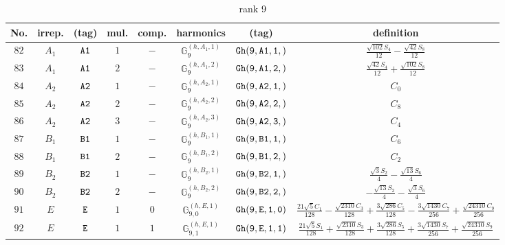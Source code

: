 \documentclass[fleqn,8pt]{jsarticle}
\begin{document}
\begin{table}[ht!]
\begin{center}
\caption{rank 9}
\renewcommand{\arraystretch}{1.3}
\begin{tabular}{cccccccc} \hline \hline
No. & irrep. & (tag) & mul. & comp. & harmonics & (tag) & definition \\ \hline
$ 82 $ & $ A_{1} $ & $ {\tt A1} $ & $ 1 $ & $ - $ & $ \mathbb{G}_{9}^{(h,A_{1},1)} $ & $ {\tt Gh(9,A1,1,)} $ & $ \frac{\sqrt{102} S_{4}}{12} - \frac{\sqrt{42} S_{8}}{12} $ \\
$ 83 $ & $ A_{1} $ & $ {\tt A1} $ & $ 2 $ & $ - $ & $ \mathbb{G}_{9}^{(h,A_{1},2)} $ & $ {\tt Gh(9,A1,2,)} $ & $ \frac{\sqrt{42} S_{4}}{12} + \frac{\sqrt{102} S_{8}}{12} $ \\
$ 84 $ & $ A_{2} $ & $ {\tt A2} $ & $ 1 $ & $ - $ & $ \mathbb{G}_{9}^{(h,A_{2},1)} $ & $ {\tt Gh(9,A2,1,)} $ & $ C_{0} $ \\
$ 85 $ & $ A_{2} $ & $ {\tt A2} $ & $ 2 $ & $ - $ & $ \mathbb{G}_{9}^{(h,A_{2},2)} $ & $ {\tt Gh(9,A2,2,)} $ & $ C_{8} $ \\
$ 86 $ & $ A_{2} $ & $ {\tt A2} $ & $ 3 $ & $ - $ & $ \mathbb{G}_{9}^{(h,A_{2},3)} $ & $ {\tt Gh(9,A2,3,)} $ & $ C_{4} $ \\
$ 87 $ & $ B_{1} $ & $ {\tt B1} $ & $ 1 $ & $ - $ & $ \mathbb{G}_{9}^{(h,B_{1},1)} $ & $ {\tt Gh(9,B1,1,)} $ & $ C_{6} $ \\
$ 88 $ & $ B_{1} $ & $ {\tt B1} $ & $ 2 $ & $ - $ & $ \mathbb{G}_{9}^{(h,B_{1},2)} $ & $ {\tt Gh(9,B1,2,)} $ & $ C_{2} $ \\
$ 89 $ & $ B_{2} $ & $ {\tt B2} $ & $ 1 $ & $ - $ & $ \mathbb{G}_{9}^{(h,B_{2},1)} $ & $ {\tt Gh(9,B2,1,)} $ & $ \frac{\sqrt{3} S_{2}}{4} - \frac{\sqrt{13} S_{6}}{4} $ \\
$ 90 $ & $ B_{2} $ & $ {\tt B2} $ & $ 2 $ & $ - $ & $ \mathbb{G}_{9}^{(h,B_{2},2)} $ & $ {\tt Gh(9,B2,2,)} $ & $ - \frac{\sqrt{13} S_{2}}{4} - \frac{\sqrt{3} S_{6}}{4} $ \\
$ 91 $ & $ E $ & $ {\tt E} $ & $ 1 $ & $ 0 $ & $ \mathbb{G}_{9,0}^{(h,E,1)} $ & $ {\tt Gh(9,E,1,0)} $ & $ \frac{21 \sqrt{5} C_{1}}{128} - \frac{\sqrt{2310} C_{3}}{128} + \frac{3 \sqrt{286} C_{5}}{128} - \frac{3 \sqrt{1430} C_{7}}{256} + \frac{\sqrt{24310} C_{9}}{256} $ \\
$ 92 $ & $ E $ & $ {\tt E} $ & $ 1 $ & $ 1 $ & $ \mathbb{G}_{9,1}^{(h,E,1)} $ & $ {\tt Gh(9,E,1,1)} $ & $ \frac{21 \sqrt{5} S_{1}}{128} + \frac{\sqrt{2310} S_{3}}{128} + \frac{3 \sqrt{286} S_{5}}{128} + \frac{3 \sqrt{1430} S_{7}}{256} + \frac{\sqrt{24310} S_{9}}{256} $ \\

\end{tabular}
\end{center}
\end{table}
\end{document}
